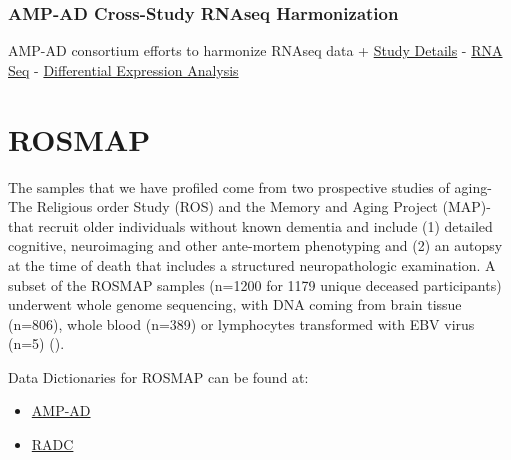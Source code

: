 \documentclass[]{book}
\providecommand{\tightlist}{%
  \setlength{\itemsep}{0pt}\setlength{\parskip}{0pt}}
\begin{document}
\hypertarget{amp-ad-cross-study-rnaseq-harmonization}{%
\subsection{AMP-AD Cross-Study RNAseq Harmonization}\label{amp-ad-cross-study-rnaseq-harmonization}}

AMP-AD consortium efforts to harmonize RNAseq data
+ \href{https://www.synapse.org/\#!Synapse:syn9702085}{Study Details}
- \href{https://www.synapse.org/\#!Synapse:syn17010685}{RNA Seq}
- \href{https://www.synapse.org/\#!Synapse:syn14237651}{Differential Expression Analysis}

\hypertarget{rosmap}{%
\chapter{ROSMAP}\label{rosmap}}

The samples that we have profiled come from two prospective studies of aging-The Religious order Study (ROS) and the Memory and Aging Project (MAP)-that recruit older individuals without known dementia and include (1) detailed cognitive, neuroimaging and other ante-mortem phenotyping and (2) an autopsy at the time of death that includes a structured neuropathologic examination. A subset of the ROSMAP samples (n=1200 for 1179 unique deceased participants) underwent whole genome sequencing, with DNA coming from brain tissue (n=806), whole blood (n=389) or lymphocytes transformed with EBV virus (n=5) (\citet{10.1038/sdata.2018.142}).

Data Dictionaries for ROSMAP can be found at:

\begin{itemize}
\tightlist
\item
  \href{https://adknowledgeportal.synapse.org/Explore/Studies?Study=syn3219045}{AMP-AD}
\item
  \href{https://www.radc.rush.edu/docs/var/variables.htm}{RADC}
\end{itemize}
\end{document}
